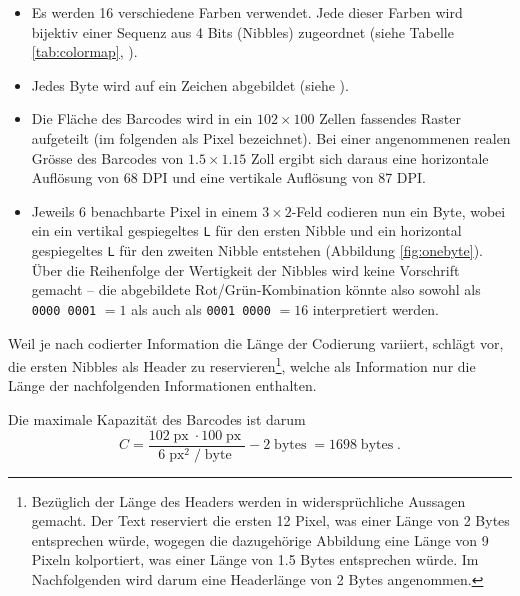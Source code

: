 \documentclass[11pt]{scrreprt} %
\theoremstyle{definition}
\begin{document}
\begin{itemize}
\item Es werden 16 verschiedene Farben verwendet. Jede dieser Farben wird bijektiv einer Sequenz aus 4 Bits (Nibbles) zugeordnet (siehe Tabelle \ref{tab:colormap}, \cite{paper}).

\item Jedes Byte wird auf ein Zeichen abgebildet (siehe \cite{paper}).

\item Die Fläche des Barcodes wird in ein $102 \times 100$ Zellen fassendes Raster aufgeteilt (im folgenden als Pixel bezeichnet). Bei einer angenommenen realen Grösse des Barcodes von $1.5 \times 1.15$ Zoll \cite{paper} ergibt sich daraus eine horizontale Auflösung von 68 DPI und eine vertikale Auflösung von 87 DPI.

\item Jeweils 6 benachbarte Pixel in einem $3 \times 2$-Feld codieren nun ein Byte, wobei ein ein vertikal gespiegeltes {\tt L} für den ersten Nibble und ein horizontal gespiegeltes {\tt L} für den zweiten Nibble entstehen (Abbildung \ref{fig:onebyte}). Über die Reihenfolge der Wertigkeit der Nibbles wird keine Vorschrift gemacht -- die abgebildete Rot/Grün-Kombination könnte also sowohl als {\tt 0000 0001} $=1$ als auch als {\tt 0001 0000} $=16$ interpretiert werden.

\end{itemize}

Weil je nach codierter Information die Länge der Codierung variiert, schlägt \cite{paper} vor, die ersten Nibbles als Header zu reservieren\footnote{Bezüglich der Länge des Headers werden in \cite{paper} widersprüchliche Aussagen gemacht. Der Text reserviert die ersten 12 Pixel, was einer Länge von 2 Bytes entsprechen würde, wogegen die dazugehörige Abbildung eine Länge von 9 Pixeln kolportiert, was einer Länge von 1.5 Bytes entsprechen würde. Im Nachfolgenden wird darum eine Headerlänge von 2 Bytes angenommen.}, welche als Information nur die Länge der nachfolgenden Informationen enthalten.

Die maximale Kapazität des Barcodes ist darum
\[
C = \frac{102 \operatorname{px} \cdot 100 \operatorname {px}}{6 \operatorname{px}^2 / \operatorname{byte}} - 2 \operatorname{bytes} = 1698 \operatorname{bytes}.
\]
\end{document}
